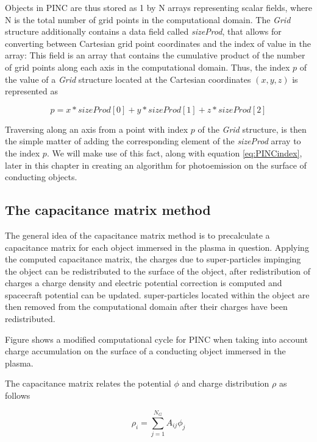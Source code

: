 Objects in PINC are thus stored as 1 by N arrays representing scalar fields, where N is the total number of grid points in the computational domain. The \textit{Grid} structure additionally contains a data field called \textit{sizeProd}, that allows for converting between Cartesian grid point coordinates and the index of value in the array: This field is an array that contains the cumulative product of the number of grid points along each axis in the computational domain. Thus, the index $p$ of the value of a \textit{Grid} structure located at the Cartesian coordinates $(x,y,z)$ is represented as

\begin{equation}\label{eq:PINCindex}
    p = x * sizeProd[0] + y * sizeProd[1] + z * sizeProd[2]
\end{equation}

Traversing along an axis from a point with index $p$ of the \textit{Grid} structure, is then the simple matter of adding the corresponding element of the \textit{sizeProd} array to the index $p$. We will make use of this fact, along with equation \ref{eq:PINCindex}, later in this chapter in creating an algorithm for photoemission on the surface of conducting objects. 


\subsection{The capacitance matrix method}
The general idea of the capacitance matrix method is to precalculate a capacitance matrix for each object immersed in the plasma in question. Applying the computed capacitance matrix, the charges due to super-particles impinging the object can be redistributed to the surface of the object, after redistribution of charges a charge density and electric potential correction is computed and spacecraft potential can be updated. super-particles located within the object are then removed from the computational domain after their charges have been redistributed. 


Figure  shows a modified computational cycle for PINC when taking into account charge accumulation on the surface of a conducting object immersed in the plasma.

The capacitance matrix relates the potential $\phi$ and charge distribution $\rho$ as follows 

\begin{equation}
    \rho_i = \sum^{N_G}_{j=1} A_{ij} \phi_j
\end{equation}

